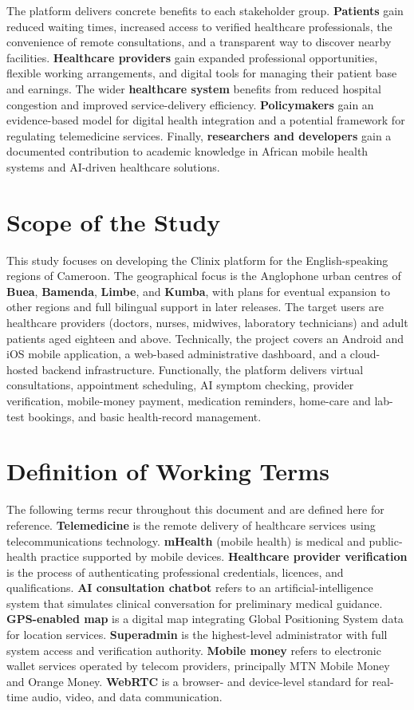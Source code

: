 The platform delivers concrete benefits to each stakeholder group. \textbf{Patients} gain reduced waiting times, increased access to verified healthcare professionals, the convenience of remote consultations, and a transparent way to discover nearby facilities. \textbf{Healthcare providers} gain expanded professional opportunities, flexible working arrangements, and digital tools for managing their patient base and earnings. The wider \textbf{healthcare system} benefits from reduced hospital congestion and improved service-delivery efficiency. \textbf{Policymakers} gain an evidence-based model for digital health integration and a potential framework for regulating telemedicine services. Finally, \textbf{researchers and developers} gain a documented contribution to academic knowledge in African mobile health systems and AI-driven healthcare solutions.

\section{Scope of the Study}

This study focuses on developing the Clinix platform for the English-speaking regions of Cameroon. The geographical focus is the Anglophone urban centres of \textbf{Buea}, \textbf{Bamenda}, \textbf{Limbe}, and \textbf{Kumba}, with plans for eventual expansion to other regions and full bilingual support in later releases. The target users are healthcare providers (doctors, nurses, midwives, laboratory technicians) and adult patients aged eighteen and above. Technically, the project covers an Android and iOS mobile application, a web-based administrative dashboard, and a cloud-hosted backend infrastructure. Functionally, the platform delivers virtual consultations, appointment scheduling, AI symptom checking, provider verification, mobile-money payment, medication reminders, home-care and lab-test bookings, and basic health-record management.

\section{Definition of Working Terms}

The following terms recur throughout this document and are defined here for reference. \textbf{Telemedicine} is the remote delivery of healthcare services using telecommunications technology. \textbf{mHealth} (mobile health) is medical and public-health practice supported by mobile devices. \textbf{Healthcare provider verification} is the process of authenticating professional credentials, licences, and qualifications. \textbf{AI consultation chatbot} refers to an artificial-intelligence system that simulates clinical conversation for preliminary medical guidance. \textbf{GPS-enabled map} is a digital map integrating Global Positioning System data for location services. \textbf{Superadmin} is the highest-level administrator with full system access and verification authority. \textbf{Mobile money} refers to electronic wallet services operated by telecom providers, principally MTN Mobile Money and Orange Money. \textbf{WebRTC} is a browser- and device-level standard for real-time audio, video, and data communication.

